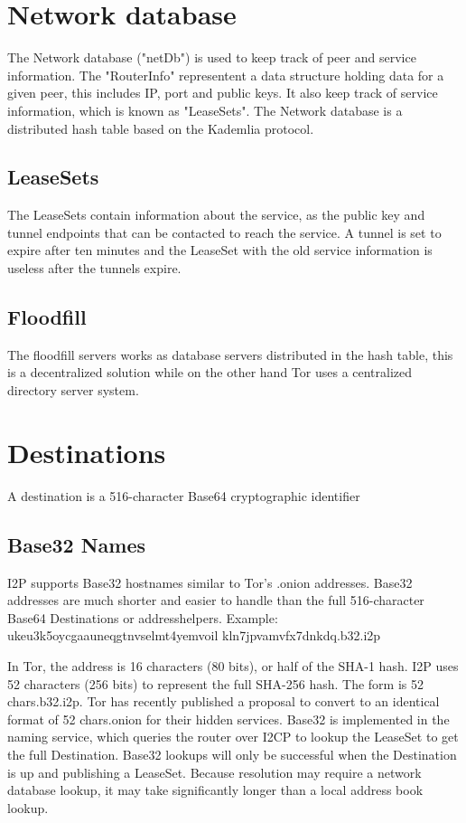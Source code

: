 \documentclass[a4paper,twocolumn,12pt]{article}
\begin{document}
\section{Network database}

The Network database ("netDb") is used to keep track of peer and service information. The "RouterInfo" representent a data structure holding data for a given peer, this includes IP, port and public keys. It also keep track of service information, which is known as "LeaseSets". The Network database is a distributed hash table based on the Kademlia protocol.

\subsection{LeaseSets}

The LeaseSets contain information about the service, as the public key and tunnel endpoints that can be contacted to reach the service. A tunnel is set to expire after ten minutes and the LeaseSet with the old service information is useless after the tunnels expire. 

\subsection{Floodfill}

The floodfill servers works as database servers distributed in the hash table, this is a decentralized solution while on the other hand Tor uses a centralized directory server system.

\section{Destinations}

A destination is a 516-character Base64 cryptographic identifier

\subsection{Base32 Names}

I2P supports Base32 hostnames similar to Tor's .onion addresses. Base32 addresses are much shorter and easier to handle than the full 516-character Base64 Destinations or addresshelpers. Example: 
ukeu3k5oycgaauneqgtnvselmt4yemvoil
kln7jpvamvfx7dnkdq.b32.i2p

In Tor, the address is 16 characters (80 bits), or half of the SHA-1 hash.
\cite{tor-hiddenservice}
I2P uses 52 characters (256 bits) to represent the full SHA-256 hash. The form is {52 chars}.b32.i2p. Tor has recently published a proposal to convert to an identical format of {52 chars}.onion for their hidden services. Base32 is implemented in the naming service, which queries the router over I2CP to lookup the LeaseSet to get the full Destination. Base32 lookups will only be successful when the Destination is up and publishing a LeaseSet. Because resolution may require a network database lookup, it may take significantly longer than a local address book lookup.
\end{document}
